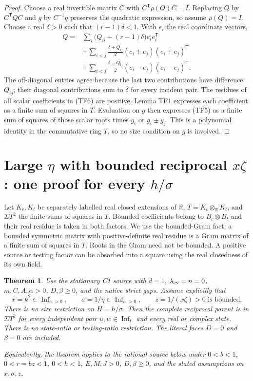 \documentclass[10pt,a4paper]{article}
\newtheorem{theorem}{Theorem}
\begin{document}
\begin{proof}
Choose a real invertible matrix $C$ with
$C^{\mathsf T}\rho(Q)C=I$. Replacing $Q$ by
$C^{\mathsf T}QC$ and $g$ by $C^{-1}g$ preserves the quadratic
expression, so assume $\rho(Q)=I$. Choose a real $\delta>0$ such
that $(r-1)\delta<1$. With $e_i$ the real coordinate vectors,
\[
\begin{split}
 Q={}&\sum_i\bigl(Q_{ii}-(r-1)\delta\bigr)e_ie_i^{\mathsf T}\\
 &+\sum_{i<j}\frac{\delta+Q_{ij}}2
                (e_i+e_j)(e_i+e_j)^{\mathsf T}\\
 &+\sum_{i<j}\frac{\delta-Q_{ij}}2
                (e_i-e_j)(e_i-e_j)^{\mathsf T}.
\end{split}
 \tag{TF6}
\]
The off-diagonal entries agree because the last two contributions
have difference $Q_{ij}$; their diagonal contributions sum to
$\delta$ for every incident pair. The residues of all scalar
coefficients in (TF6) are positive. Lemma TF1 expresses each
coefficient as a finite sum of squares in $T$. Evaluation on $g$
then expresses (TF5) as a finite sum of squares of those scalar roots
times $g_i$ or $g_i\pm g_j$. This is a polynomial identity in the
commutative ring $T$, so no size condition on $g$ is involved.
\end{proof}


\section{Large $\eta$ with bounded reciprocal $x\zeta$: one proof for every $h/\sigma$}
\label{sec:c1-unification-bounded-z-all-H}

Let $K_c,K_t$ be separately labelled real closed extensions of $\mathbb R$,
$T=K_c\otimes_{\mathbb R}K_t$, and $\Sigma T^2$ the finite sums of
squares in $T$. Bounded coefficients belong to $B_c\otimes B_t$ and
their real residue is taken in both factors. We use the bounded-Gram
fact: a bounded symmetric matrix with positive-definite real residue
is a Gram matrix of a finite sum of squares in $T$. Roots in the Gram
need not be bounded. A positive source or testing factor can be absorbed
into a square using the real closedness of its own field.

\begin{theorem}\label{thm:c1-unification-bounded-z-all-H}
Use the stationary C1 source with $d=1$, $\lambda_{\rm ev}=n=0$,
$m,C,A,\alpha>0$, $D,\beta\ge0$, and the native strict gaps. Assume
explicitly that
\[
 x=k^2\in\operatorname{Inf}_{c,>0},\qquad
 \sigma=1/\eta\in\operatorname{Inf}_{c,>0},\qquad
 z=1/(x\zeta)>0\text{ is bounded}.
\]
There is no size restriction on $H=h/\sigma$. Then the complete
reciprocal parent is in $\Sigma T^2$ for every independent pair
$u,w\in\operatorname{Inf}_t$ and every real or complex state.
There is no state-ratio or testing-ratio restriction. The literal
faces $D=0$ and $\beta=0$ are included.

Equivalently, the theorem applies to the rational source below under
$0<b<1$, $0<r=bz<1$, $0<h<1$, $E,M,J>0$, $D,\beta\ge0$,
and the stated assumptions on $x,\sigma,z$.
\end{theorem}
\end{document}
